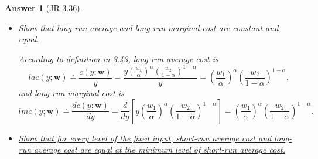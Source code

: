 \documentclass{article}
\newtheorem*{ans}{Answer}
\newcommand{\1}{{\bf 1}}
\newcommand{\0}{{\mathbf{0}}}
\newcommand{\w}{{\mathbf{w}}}
\newcommand{\<}{\langle}
\renewcommand{\>}{\rangle}
\begin{document}
\begin{ans}[JR 3.36]
\begin{itemize}
By fixing $x_2$, we have 
	$$
	sc(  y; \w, x_2) \doteq w_2x_2 +	\min_{\substack{x_1 \ge 0 \\ x_1 \ge y^{\frac1{\alpha}} x_2^{ - \frac{  1- \alpha}{\alpha} } } }   w_1 x_1  = w_2 x_2  + w_1 y^{\frac1{\alpha}} x_2^{ - \frac{ 1- \alpha }{\alpha} }.  
	$$
	
		Similarly by fixing $x_1$, we have 
	$$
	sc(  y; \w, x_1) \doteq w_1x_1 +	\min_{\substack{x_2 \ge 0 \\ x_2 \ge y^{\frac1{1 - \alpha}} x_1^{\frac{- \alpha}{1 - \alpha} } } }   w_2x_2  = w_1x_1  + w_2 y^{\frac1{1 - \alpha}} x_1^{ - \frac{ \alpha}{1 - \alpha} }.  
	$$
	\item \ul{Show that long-run average and long-run marginal cost are constant and equal.}
	
	According to definition in 3.43, long-run average cost is 
	$$lac(y;\w) \doteq \frac{c(y;\w)}y = \frac{y \left(\frac{w_1}{\alpha}\right)^\alpha \left(\frac{w_2}{1 - \alpha }\right)^{1 - \alpha}}y =\left(\frac{w_1}{\alpha}\right)^\alpha \left(\frac{w_2}{1 - \alpha }\right)^{1 - \alpha }, $$ and long-run marginal cost is 
	$$lmc(y; \w )\doteq \frac{dc( y; \w )}{dy} = \frac{d}{dy }\left[y \left(\frac{w_1}{\alpha}\right)^\alpha \left(\frac{w_2}{1 - \alpha }\right)^{1 - \alpha}\right] = \left(\frac{w_1}{\alpha}\right)^\alpha \left(\frac{w_2}{1 - \alpha }\right)^{1 - \alpha}.$$
	

	\item \ul{Show that for every level of the fixed input, short-run average cost and long-run average cost are equal at the minimum level of short-run average cost.} 


\end{itemize}
\end{ans}
\end{document}
